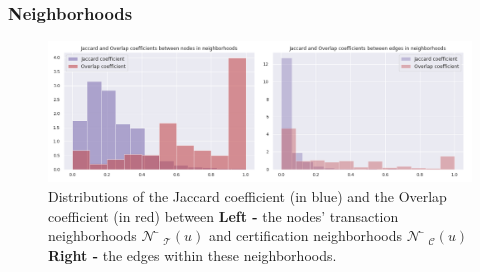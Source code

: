\documentclass{beamer}
\begin{document}

\begin{frame}
	\frametitle{Neighborhoods}
	\begin{figure}
		\includegraphics[width=\linewidth]{./figures/neighborhoods}
		\caption{Distributions of the Jaccard coefficient (in blue) and the Overlap coefficient (in red) between \textbf{Left -} the nodes’ transaction neighborhoods $\mathcal{N̄}_{\mathcal{T}} \left(u \right)$ and certification neighborhoods $\mathcal{N̄}_{\mathcal{C}} \left(u \right)$ \textbf{Right -} the edges within these neighborhoods.}
	\end{figure}
\end{frame}

\end{document}
